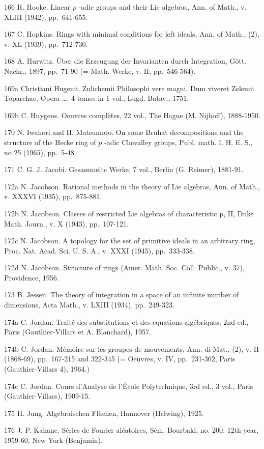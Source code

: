 166 R. Hooke. Linear \(p\) -adic groups and their Lie algebras, Ann. of Math., v. XLIII (1942), pp.~641-655.

167 C. Hopkins. Rings with minimal conditions for left ideals, Ann. of Math., (2), v. XL (1939), pp.~712-730.

168 A. Hurwitz. Über die Erzeugung der Invarianten durch Integration, Gött. Nachr., 1897, pp.~71-90 (= Math. Werke, v. II, pp.~546-564).

169a Christiani Hugenii, Zulichemii Philosophi vere magni, Dum viveret Zelemii Toparchae, Opera \ldots. 4 tomes in 1 vol., Lugd. Batav., 1751.

169b C. Huygens. Oeuvres complètes, 22 vol., The Hague (M. Nijhoff), 1888-1950.

170 N. Iwahori and H. Matsumoto. On some Bruhat decompositions and the structure of the Hecke ring of \(p\) -adic Chevalley groups, Publ. math. I. H. E. S., no 25 (1965), pp.~5-48.

171 C. G. J. Jacobi. Gesammelte Werke, 7 vol., Berlin (G. Reimer), 1881-91.

172a N. Jacobson. Rational methods in the theory of Lie algebras, Ann. of Math., v. XXXVI (1935), pp.~875-881.

172b N. Jacobson. Classes of restricted Lie algebras of characteristic p, II, Duke Math. Journ., v. X (1943), pp.~107-121.

172c N. Jacobson. A topology for the set of primitive ideals in an arbitrary ring, Proc. Nat. Acad. Sci. U. S. A., v. XXXI (1945), pp.~333-338.

172d N. Jacobson. Structure of rings (Amer. Math. Soc. Coll. Public., v. 37), Providence, 1956.

173 B. Jessen. The theory of integration in a space of an infinite number of dimensions, Acta Math., v. LXIII (1934), pp.~249-323.

174a C. Jordan. Traité des substitutions et des equations algébriques, 2nd ed., Paris (Gauthier-Villars et A. Blanchard), 1957.

174b C. Jordan. Mémoire sur les groupes de mouvements, Ann. di Mat., (2), v. II (1868-69), pp.~167-215 and 322-345 (= Oeuvres, v. IV, pp.~231-302, Paris (Gauthier-Villars 4), 1964.)

174c C. Jordan. Cours d'Analyse de l'École Polytechnique, 3rd ed., 3 vol., Paris (Gauthier-Villars), 1909-15.

175 H. Jung. Algebraischen Flächen, Hannover (Helwing), 1925.

176 J. P. Kahane. Séries de Fourier aléatoires, Sém. Bourbaki, no. 200, 12th year, 1959-60, New York (Benjamin).

